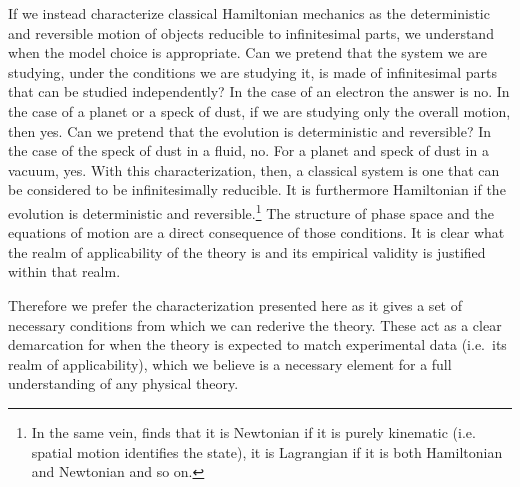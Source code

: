 \documentclass[11pt]{article}
\begin{document}
If we instead characterize classical Hamiltonian mechanics as the deterministic and reversible motion of objects reducible to infinitesimal parts, we understand when the model choice is appropriate. Can we pretend that the system we are studying, under the conditions we are studying it, is made of infinitesimal parts that can be studied independently? In the case of an electron the answer is no. In the case of a planet or a speck of dust, if we are studying only the overall motion, then yes. Can we pretend that the evolution is deterministic and reversible? In the case of the speck of dust in a fluid, no. For a planet and speck of dust in a vacuum, yes. With this characterization, then, a classical system is one that can be considered to be infinitesimally reducible. It is furthermore Hamiltonian if the evolution is deterministic and reversible.\footnote{In the same vein, \cite{AoPPhy1} finds that it is Newtonian if it is purely kinematic (i.e. spatial motion identifies the state), it is Lagrangian if it is both Hamiltonian and Newtonian and so on.} The structure of phase space and the equations of motion are a direct consequence of those conditions. It is clear what the realm of applicability of the theory is and its empirical validity is justified within that realm.

Therefore we prefer the characterization presented here as it gives a set of necessary conditions from which we can rederive the theory. These act as a clear demarcation for when the theory is expected to match experimental data (i.e.~its realm of applicability), which we believe is a necessary element for a full understanding of any physical theory.





{}
\end{document}
